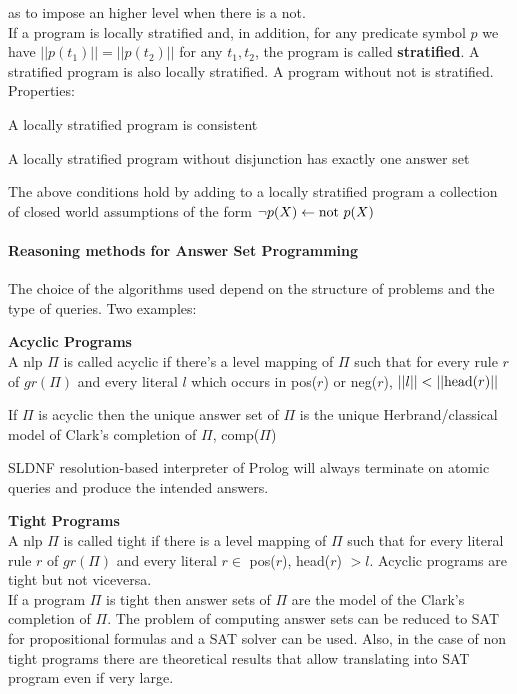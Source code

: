 \documentclass[10pt]{report}
\begin{document}
as to impose an higher level when there is a not.\\
If a program is locally stratified and, in addition, for any predicate symbol $p$ we have $||p(t_1)||=||p(t_2)||$ for any $t_1,t_2$, the program is called \textbf{stratified}. A stratified program is also locally stratified. A program without not is stratified. Properties:
\begin{list}{}{}
	\item A locally stratified program is consistent
	\item A locally stratified program without disjunction has exactly one answer set
	\item The above conditions hold by adding to a locally stratified program a collection of closed world assumptions of the form $\neg p(X)\leftarrow \hbox{not }p(X)$
\end{list}
\paragraph{Reasoning methods for Answer Set Programming}
The choice of the algorithms used depend on the structure of problems and the type of queries. Two examples:
\begin{list}{}{}
	\item \textbf{Acyclic Programs}\\
	A nlp $\Pi$ is called acyclic if there's a level mapping of $\Pi$ such that for every rule $r$ of $gr(\Pi)$ and every literal $l$ which occurs in pos($r$) or neg($r$), $||l||<||\hbox{head}(r)||$\begin{list}{}{}
		\item If $\Pi$ is acyclic then the unique answer set of $\Pi$ is the unique Herbrand/classical model of Clark's completion of $\Pi$, comp($\Pi$)
		\item SLDNF resolution-based interpreter of Prolog will always terminate on atomic queries and produce the intended answers.
	\end{list}
	\item \textbf{Tight Programs}\\
	A nlp $\Pi$ is called tight if there is a level mapping of $\Pi$ such that for every literal rule $r$ of $gr(\Pi)$ and every literal $r\in$ pos($r$), head($r$) $>l$. Acyclic programs are tight but not viceversa.\\
	If a program $\Pi$ is tight then answer sets of $\Pi$ are the model of the Clark's completion of $\Pi$. The problem of computing answer sets can be reduced to SAT for propositional formulas and a SAT solver can be used. Also, in the case of non tight programs there are theoretical results that allow translating into SAT program even if very large.
\end{list}
\end{document}
